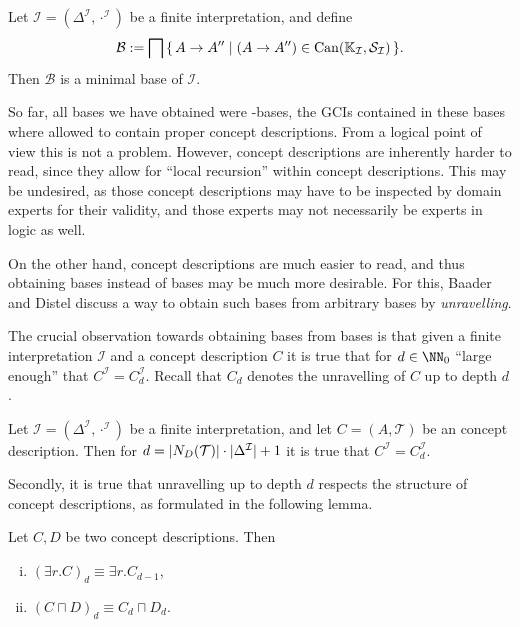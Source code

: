 \begin{Theorem}
  \label{thm:Felix-5.18}
  Let $\mathcal{I} = (\Delta^{\mathcal{I}}, \cdot^{\mathcal{I}})$ be a finite
  interpretation, and define
  \begin{equation*}
    \mathcal{B} := \bigsqcap {\ensuremath{\{\, A \to A'' \mid (A \to A'') \in \operatorname{Can}({\mathbb{K}}_{\mathcal{I}}, \mathcal{S}_{\mathcal{I}}) \,\}}}.
  \end{equation*}
  Then $\mathcal{B}$ is a minimal base of $\mathcal{I}$.
\end{Theorem}

So far, all bases we have obtained were \ELgfpbot-bases, \ie the GCIs contained in these
bases where allowed to contain proper \ELgfpbot concept descriptions.  From a logical
point of view this is not a problem.  However, \ELgfpbot concept descriptions are
inherently harder to read, since they allow for ``local recursion'' within concept
descriptions.  This may be undesired, as those concept descriptions may have to be
inspected by domain experts for their validity, and those experts may not necessarily be
experts in logic as well.

On the other hand, \ELbot concept descriptions are much easier to read, and thus obtaining
\ELbot bases instead of \ELgfpbot bases may be much more desirable.  For this, Baader and
Distel discuss a way to obtain such \ELbot bases from arbitrary \ELgfpbot bases by
\emph{unravelling}.

The crucial observation towards obtaining \ELbot bases from \ELgfpbot bases is that given
a finite interpretation $\mathcal{I}$ and a concept description $C$ it is true that for $d
\in \NN_0$ ``large enough'' that $C^{\mathcal{I}} = C_d^{\mathcal{I}}$.  Recall that $C_d$
denotes the unravelling of $C$ up to depth $d$.

\begin{Lemma}
  \label{lem:Felix-lemma-5.5}
  Let $\mathcal{I} = (\Delta^{\mathcal{I}}, \cdot^{\mathcal{I}})$ be a finite
  interpretation, and let $C = (A, \mathcal{T})$ be an \ELgfp concept description.
  Then for $d = \lvert N_D(\mathcal{T}) \rvert \cdot \lvert \Delta^{\mathcal{I}} \rvert + 1$ it is
  true that $C^{\mathcal{I}} = C_d^{\mathcal{I}}$.
\end{Lemma}

Secondly, it is true that unravelling up to depth $d$ respects the structure of \ELbot
concept descriptions, as formulated in the following lemma.

\begin{Lemma}
  \label{lem:unravelling-is-homomorphism}
  Let $C, D$ be two \ELgfp concept descriptions.  Then
  \begin{enumerate}[i. ]
  \item $(\exists r. C)_d \equiv \exists r. C_{d-1}$,
  \item $(C \sqcap D)_d \equiv C_d \sqcap D_d$.
  \end{enumerate}
\end{Lemma}


